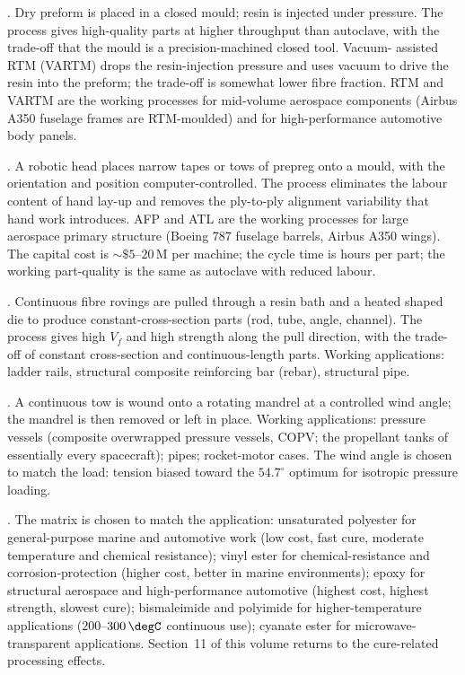 . Dry preform is placed in a
closed mould; resin is injected under pressure. The process gives
high-quality parts at higher throughput than autoclave, with the
trade-off that the mould is a precision-machined closed tool. Vacuum-
assisted RTM (VARTM) drops the resin-injection pressure and uses
vacuum to drive the resin into the preform; the trade-off is somewhat
lower fibre fraction. RTM and VARTM are the working processes for
mid-volume aerospace components (Airbus A350 fuselage frames are
RTM-moulded) and for high-performance automotive body panels.

. A robotic head places narrow tapes or tows of prepreg onto a
mould, with the orientation and position computer-controlled. The
process eliminates the labour content of hand lay-up and removes the
ply-to-ply alignment variability that hand work introduces. AFP and
ATL are the working processes for large aerospace primary structure
(Boeing 787 fuselage barrels, Airbus A350 wings). The capital cost is
$\sim \$5$--$20\,\text{M}$ per machine; the cycle time is hours per
part; the working part-quality is the same as autoclave with reduced
labour.

. Continuous fibre rovings are pulled through a
resin bath and a heated shaped die to produce constant-cross-section
parts (rod, tube, angle, channel). The process gives high $V_f$ and
high strength along the pull direction, with the trade-off of
constant cross-section and continuous-length parts. Working
applications: ladder rails, structural composite reinforcing bar
(rebar), structural pipe.

. A continuous tow is wound onto a rotating
mandrel at a controlled wind angle; the mandrel is then removed or
left in place. Working applications: pressure vessels (composite
overwrapped pressure vessels, COPV; the propellant tanks of essentially
every spacecraft); pipes; rocket-motor cases. The wind angle is chosen
to match the load: tension biased toward the $54.7^\circ$ optimum for
isotropic pressure loading.

. The matrix is chosen to match the application:
unsaturated polyester for general-purpose marine and automotive work
(low cost, fast cure, moderate temperature and chemical resistance);
vinyl ester for chemical-resistance and corrosion-protection (higher
cost, better in marine environments); epoxy for structural aerospace
and high-performance automotive (highest cost, highest strength,
slowest cure); bismaleimide and polyimide for higher-temperature
applications ($200$--$300\,\degC$ continuous use); cyanate ester for
microwave-transparent applications. Section~11 of this volume returns
to the cure-related processing effects.

